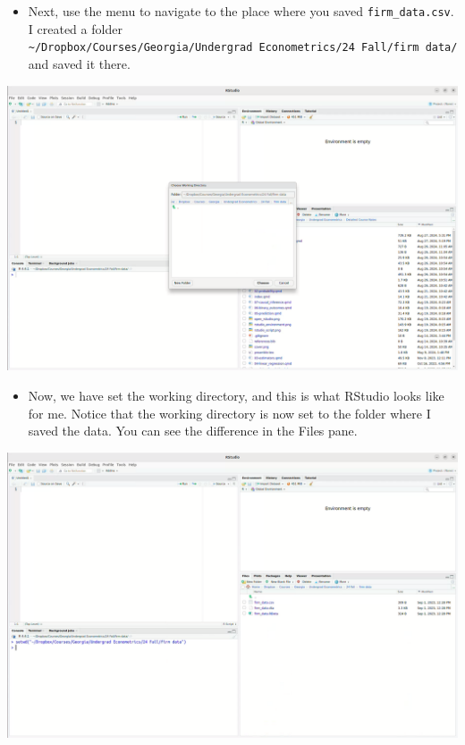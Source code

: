 \documentclass[
  letterpaper,
  DIV=11,
  numbers=noendperiod]{scrreprt}
\providecommand{\tightlist}{%
  \setlength{\itemsep}{0pt}\setlength{\parskip}{0pt}}\usepackage{longtable,booktabs,array}
\begin{document}
\begin{itemize}
\tightlist
\item
  Next, use the menu to navigate to the place where you saved
  \texttt{firm\_data.csv}. I created a folder
  \texttt{\textasciitilde{}/Dropbox/Courses/Georgia/Undergrad\ Econometrics/24\ Fall/firm\ data/}
  and saved it there.
\end{itemize}

\includegraphics{set_wd2.png}

\begin{itemize}
\tightlist
\item
  Now, we have set the working directory, and this is what RStudio looks
  like for me. Notice that the working directory is now set to the
  folder where I saved the data. You can see the difference in the Files
  pane.
\end{itemize}

\includegraphics{set_wd3.png}
\end{document}
